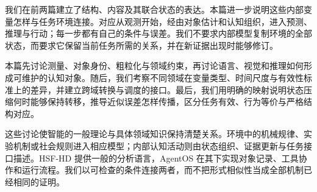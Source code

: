 \label{part:physical-isomorphism}

我们在前两篇建立了结构、内容及其联合状态的表达。本篇进一步说明这些内部变量怎样与任务环境连接。对应从观测开始，经由对象估计和认知组织，进入预测、推理与行动；每一步都有自己的条件与误差。我们不要求内部模型复制环境的全部状态，而要求它保留当前任务所需的关系，并在新证据出现时能够修订。

本篇先讨论测量、对象身份、粗粒化与领域约束，再讨论语言、视觉和推理如何形成可维护的认知对象。随后，我们考察不同领域在变量类型、时间尺度与有效性标准上的差异，并建立跨域转换与调度的接口。最后，我们用明确的映射说明状态压缩何时能够保持转移，推导近似误差怎样传播，区分任务有效、行为等价与严格结构对应。

这些讨论使智能的一般理论与具体领域知识保持清楚关系。环境中的机械规律、实验机制或社会规则进入相应模型；内部认知活动则由状态组织、证据更新与任务接口描述。HSF-HD 提供一般的分析语言，AgentOS 在其下实现对象记录、工具协作和运行流程。我们以可检查的条件连接两者，而不把形式相似性当成全部机制已经相同的证明。

